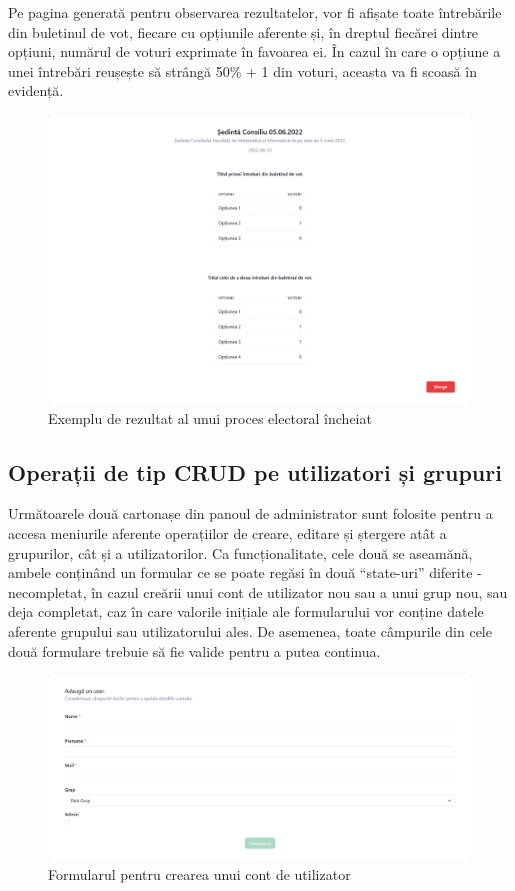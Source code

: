 Pe pagina generată pentru observarea rezultatelor, vor fi afișate toate întrebările din buletinul de vot, fiecare cu opțiunile aferente și, în dreptul fiecărei dintre opțiuni, numărul de voturi exprimate în favoarea ei. În cazul în care o opțiune a unei întrebări reușește să strângă 50\% + 1 din voturi, aceasta va fi scoasă în evidență.

\begin{figure}[!ht]
    \centering
    \includegraphics[width=135mm]{images/example_vote_results.png}
    \caption{Exemplu de rezultat al unui proces electoral încheiat}
\end{figure}

\newpage

\subsection{Operații de tip CRUD pe utilizatori și grupuri}

Următoarele două cartonașe din panoul de administrator sunt folosite pentru a accesa meniurile aferente operațiilor de creare, editare și ștergere atât a grupurilor, cât și a utilizatorilor. Ca funcționalitate, cele două se aseamănă, ambele conținând un formular ce se poate regăsi în două \enquote{state-uri} diferite - necompletat, în cazul creării unui cont de utilizator nou sau a unui grup nou, sau deja completat, caz în care valorile inițiale ale formularului vor conține datele aferente grupului sau utilizatorului ales. De asemenea, toate câmpurile din cele două formulare trebuie să fie valide pentru a putea continua.

\begin{figure}[!ht]
    \centering
    \includegraphics[width=140mm]{images/crud_user.png}
    \caption{Formularul pentru crearea unui cont de utilizator}
\end{figure}

